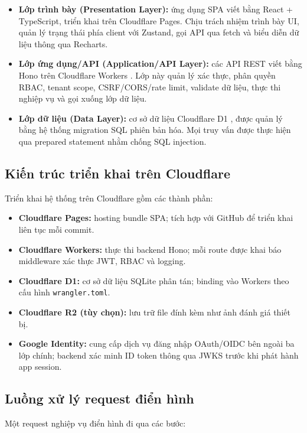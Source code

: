 \begin{itemize}[leftmargin=1.2cm]
    \item \textbf{Lớp trình bày (Presentation Layer):} ứng dụng SPA viết bằng React + TypeScript, triển khai trên Cloudflare Pages. Chịu trách nhiệm trình bày UI, quản lý trạng thái phía client với Zustand, gọi API qua fetch và biểu diễn dữ liệu thông qua Recharts.
    \item \textbf{Lớp ứng dụng/API (Application/API Layer):} các API REST viết bằng Hono trên Cloudflare Workers \cite{cloudflareWorkers, honoFramework}. Lớp này quản lý xác thực, phân quyền RBAC, tenant scope, CSRF/CORS/rate limit, validate dữ liệu, thực thi nghiệp vụ và gọi xuống lớp dữ liệu.
    \item \textbf{Lớp dữ liệu (Data Layer):} cơ sở dữ liệu Cloudflare D1 \cite{cloudflareD1}, được quản lý bằng hệ thống migration SQL phiên bản hóa. Mọi truy vấn được thực hiện qua prepared statement nhằm chống SQL injection.
\end{itemize}

\subsection{Kiến trúc triển khai trên Cloudflare}
Triển khai hệ thống trên Cloudflare gồm các thành phần:

\begin{itemize}[leftmargin=1.2cm]
    \item \textbf{Cloudflare Pages:} hosting bundle SPA; tích hợp với GitHub để triển khai liên tục mỗi commit.
    \item \textbf{Cloudflare Workers:} thực thi backend Hono; mỗi route được khai báo middleware xác thực JWT, RBAC và logging.
    \item \textbf{Cloudflare D1:} cơ sở dữ liệu SQLite phân tán; binding vào Workers theo cấu hình \texttt{wrangler.toml}.
    \item \textbf{Cloudflare R2 (tùy chọn):} lưu trữ file đính kèm như ảnh đánh giá thiết bị.
    \item \textbf{Google Identity:} cung cấp dịch vụ đăng nhập OAuth/OIDC bên ngoài ba lớp chính; backend xác minh ID token thông qua JWKS trước khi phát hành app session.
\end{itemize}


\subsection{Luồng xử lý request điển hình}
Một request nghiệp vụ điển hình đi qua các bước:

